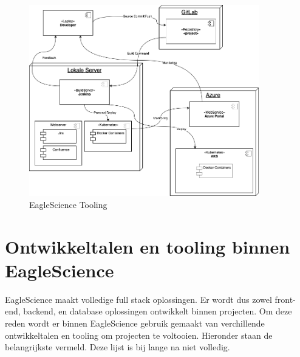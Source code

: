 \begin{figure}[bth]
    \myfloatalign
    \includegraphics[width=10cm]{gfx/ES-BuildArchitecture}
    \caption{EagleScience Tooling}
    \label{fig:es-tooling}
\end{figure}



\section{Ontwikkeltalen en tooling binnen EagleScience}\label{sec:ontwikkeltalen-en-tooling-binnen-eaglescience}
EagleScience maakt volledige full stack oplossingen. Er wordt dus zowel front-end, backend, en database oplossingen ontwikkelt binnen projecten. Om deze reden wordt er binnen EagleScience gebruik gemaakt van verchillende ontwikkeltalen en tooling om projecten te voltooien. Hieronder staan de belangrijkste vermeld. Deze lijst is bij lange na niet volledig.

